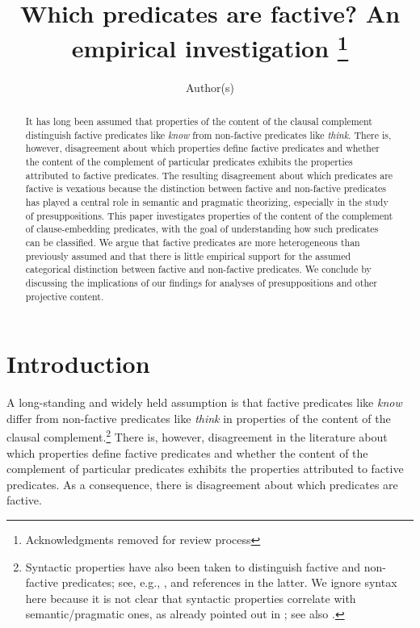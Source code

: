 \documentclass[11pt,fleqn]{article}
\title{Which predicates are factive? An empirical investigation%
\thanks{Acknowledgments removed for review process}}
\author{Author(s)}
\newcommand{\6}{\mbox{$[\hspace*{-.6mm}[$}}
\newcommand{\9}{\mbox{$]\hspace*{-.6mm}]$}}
\begin{document}

\maketitle


\begin{abstract}

It has long been assumed that properties of the content of the clausal complement distinguish factive predicates like {\em know} from non-factive predicates like {\em think}. There is, however, disagreement about which properties define factive predicates and whether the content of the complement of particular predicates exhibits the properties attributed to factive predicates. The resulting disagreement about which predicates are factive is vexatious because the distinction between factive and non-factive predicates has played a central role in semantic and pragmatic theorizing, especially in the study of presuppositions. This paper investigates properties of the content of the complement of clause-embedding predicates, with the goal of understanding how such predicates can be classified. We argue that factive predicates are more heterogeneous than previously assumed and that there is little empirical support for the assumed categorical distinction between factive and non-factive predicates. We conclude by discussing the implications of our findings for analyses of presuppositions and other projective content.


\end{abstract}

			
\section{Introduction}\label{s1}

A long-standing and widely held assumption is that factive predicates like {\em know} differ from non-factive predicates like {\em think} in properties of the content of the clausal complement.\footnote{Syntactic properties have also been taken to distinguish factive and non-factive predicates; see, e.g., \citealt{kiparsky-kiparsky70}, \citealt{white-etal2018} and references in the latter. We ignore syntax here because it is not clear that syntactic properties correlate with semantic/pragmatic ones, as already pointed out in \citealt[fn.3]{kiparsky-kiparsky70}; see also \citealt{white-rawlins-nels2018}.} There is, however, disagreement in the literature about which properties define factive predicates and whether the content of the complement of particular predicates exhibits the properties attributed to factive predicates. As a consequence, there is disagreement about which predicates are factive. 
\end{document}
